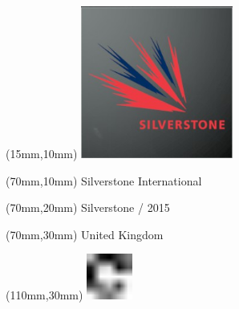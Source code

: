 \null\newpage
\begin{textblock*}{50mm}(15mm,10mm)%
\includegraphics[width=50mm]{LG/2015-05-20_00094.png}
\end{textblock*}
\begin{textblock*}{130mm}(70mm,10mm)%
{\fontsize{20}{20}\selectfont Silverstone International}\\
\end{textblock*}
\begin{textblock*}{120mm}(70mm,20mm)%
{\fontsize{16}{16}\selectfont Silverstone / 2015}\\
\end{textblock*}
\begin{textblock*}{120mm}(70mm,30mm)%
{\fontsize{12}{12}\selectfont United Kingdom}
\end{textblock*}
\begin{textblock*}{30mm}(110mm,30mm)%
\centering
\includegraphics[height=15mm]{icons/fa-rotate-right.pdf}
\end{textblock*}
